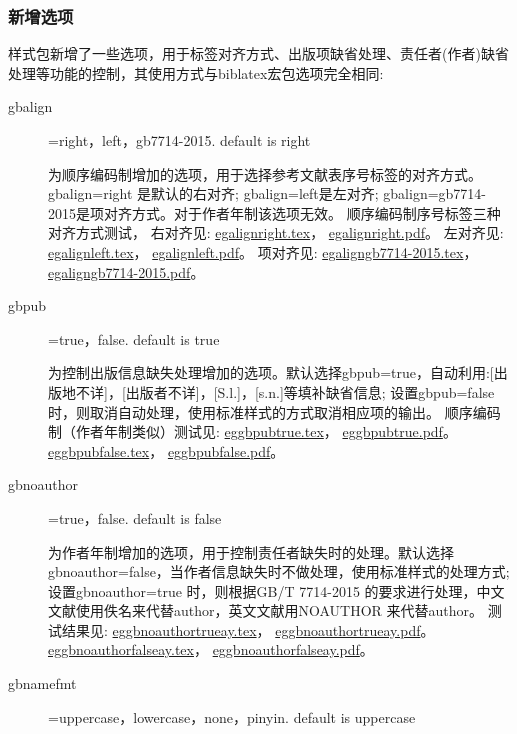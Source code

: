 \subsubsection{新增选项}\label{sec:added:opt}
样式包新增了一些选项，用于标签对齐方式、出版项缺省处理、责任者(作者)缺省处理等功能的控制，其使用方式与biblatex宏包选项完全相同:
\begin{description}
  \item[gbalign]=right，left，gb7714-2015. \hfill default is right

  为顺序编码制增加的选项，用于选择参考文献表序号标签的对齐方式。gbalign=right 是默认的右对齐; gbalign=left是左对齐; gbalign=gb7714-2015是项对齐方式。对于作者年制该选项无效。
  顺序编码制序号标签三种对齐方式测试，
  右对齐见:
  \href{run:./example/egalignright.tex}{egalignright.tex}，
  \href{run:./example/egalignright.pdf}{egalignright.pdf}。
  左对齐见:
  \href{run:./example/egalignleft.tex}{egalignleft.tex}，
  \href{run:./example/egalignleft.pdf}{egalignleft.pdf}。
  项对齐见:
  \href{run:./example/egaligngb7714-2015.tex}{egaligngb7714-2015.tex}，
  \href{run:./example/egaligngb7714-2015.pdf}{egaligngb7714-2015.pdf}。

  \item[gbpub]=true，false. \hfill default is true

  为控制出版信息缺失处理增加的选项。默认选择gbpub=true，自动利用:[出版地不详]，[出版者不详]，[S.l.]，[s.n.]等填补缺省信息; 设置gbpub=false 时，则取消自动处理，使用标准样式的方式取消相应项的输出。
  顺序编码制（作者年制类似）测试见:
  \href{run:./example/eggbpubtrue.tex}{eggbpubtrue.tex}，
  \href{run:./example/eggbpubtrue.pdf}{eggbpubtrue.pdf}。
  \href{run:./example/eggbpubfalse.tex}{eggbpubfalse.tex}，
  \href{run:./example/eggbpubfalse.pdf}{eggbpubfalse.pdf}。

  \item[gbnoauthor]=true，false. \hfill default is false

  为作者年制增加的选项，用于控制责任者缺失时的处理。默认选择gbnoauthor=false，当作者信息缺失时不做处理，使用标准样式的处理方式; 设置gbnoauthor=true 时，则根据GB/T 7714-2015 的要求进行处理，中文文献使用佚名来代替author，英文文献用NOAUTHOR 来代替author。
  测试结果见:
  \href{run:./example/eggbnoauthortrueay.tex}{eggbnoauthortrueay.tex}，
  \href{run:./example/eggbnoauthortrueay.pdf}{eggbnoauthortrueay.pdf}。
  \href{run:./example/eggbnoauthorfalseay.tex}{eggbnoauthorfalseay.tex}，
  \href{run:./example/eggbnoauthorfalseay.pdf}{eggbnoauthorfalseay.pdf}。

  \item[gbnamefmt]=uppercase，lowercase，none，pinyin. \hfill default is uppercase


\end{description}
